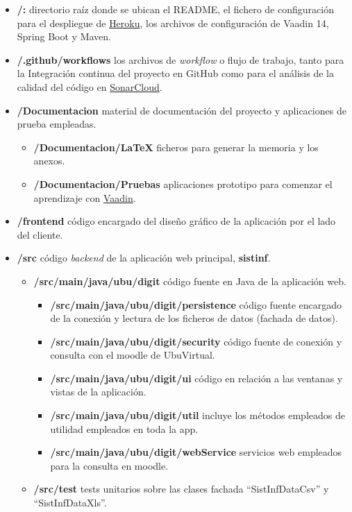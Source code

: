 \begin{itemize}
	\item \textbf{/:} directorio raíz donde se ubican el README, el fichero de configuración para el despliegue de \href{https://dashboard.heroku.com/}{Heroku}, los archivos de configuración de Vaadin 14, Spring Boot y Maven. 
	\item \textbf{/.github/workflows} los archivos de \textit{workflow} o flujo de trabajo, tanto para la Integración continua del proyecto en GitHub como para el análisis de la calidad del código en \href{https://sonarcloud.io/}{SonarCloud}.
	\item \textbf{/Documentacion} material de documentación del proyecto y aplicaciones de prueba empleadas.
		\begin{itemize}
			\tightlist
			\item \textbf{/Documentacion/LaTeX} ficheros para generar la memoria y los anexos.
			\item \textbf{/Documentacion/Pruebas} aplicaciones prototipo para comenzar el aprendizaje con \href{https://vaadin.com/}{Vaadin}.
		\end{itemize}
	\item \textbf{/frontend} código encargado del diseño gráfico de la aplicación por el lado del cliente.
	\item \textbf{/src} código \textit{backend} de la aplicación web principal, \textbf{sistinf}.
	\begin{itemize}
		\tightlist
		\item \textbf{/src/main/java/ubu/digit} código fuente en Java de la aplicación web.
			\begin{itemize}
				\item \textbf{/src/main/java/ubu/digit/persistence} código fuente encargado de la conexión y lectura de los ficheros de datos (fachada de datos).
				\item \textbf{/src/main/java/ubu/digit/security} código fuente de conexión y consulta con el moodle de UbuVirtual.
				\item \textbf{/src/main/java/ubu/digit/ui} código en relación a las ventanas y vistas de la aplicación.
				\item \textbf{/src/main/java/ubu/digit/util} incluye los métodos empleados de utilidad empleados en toda la app. 
				\item \textbf{/src/main/java/ubu/digit/webService} servicios web empleados para la consulta en moodle.
			\end{itemize}
		\item \textbf{/src/test} tests unitarios sobre las clases fachada ``SistInfDataCsv'' y ``SistInfDataXls''.
	\end{itemize}
\end{itemize}

